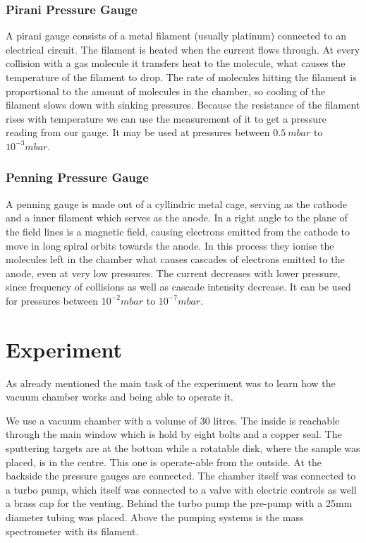 \documentclass[]{article}
\begin{document}
\subsubsection[Pirani]{Pirani Pressure Gauge}
A pirani gauge consists of a metal filament (usually platinum) connected to an electrical circuit. The filament is heated when the current flows through. At every collision with a gas molecule it transfers heat to the molecule, what causes the temperature of the filament to drop. The rate of molecules hitting the filament is proportional to the amount of molecules in the chamber, so cooling of the filament slows down with sinking pressures. Because the resistance of the filament rises with temperature we can use the measurement of it to get a pressure reading from our gauge. It may be used at pressures between $0.5\ mbar$ to $10^{-3}mbar$.

\subsubsection[Penning]{Penning Pressure Gauge}
A penning gauge is made out of a cyllindric metal cage, serving as the cathode and a inner filament which serves as the anode. In a right angle to the plane of the field lines is a magnetic field, causing electrons emitted from the cathode to move in long spiral orbits towards the anode. In this process they ionise the molecules left in the chamber what causes cascades of electrons emitted to the anode, even at very low pressures. The current decreases with lower pressure, since frequency of collisions as well as cascade intensity decrease. It can be used for pressures between $10^{-2}mbar$ to $10^{-7}mbar$.



\newpage
\section{Experiment}
As already mentioned the main task of the experiment was to learn how the vacuum chamber works and being able to operate it. 

We use a vacuum chamber with a volume of 30 litres. The inside is reachable through the main window which is hold by eight bolts and a copper seal. The sputtering targets are at the bottom while a rotatable disk, where the sample was placed, is in the centre. This one is operate-able from the outside. At the backside the pressure gauges are connected. 
The chamber itself was connected to a turbo pump, which itself was connected to a valve with electric controls as well a brass cap for the venting. Behind the turbo pump the pre-pump with a 25mm diameter tubing was placed. Above the pumping systems is the mass spectrometer with its filament.
\end{document}
